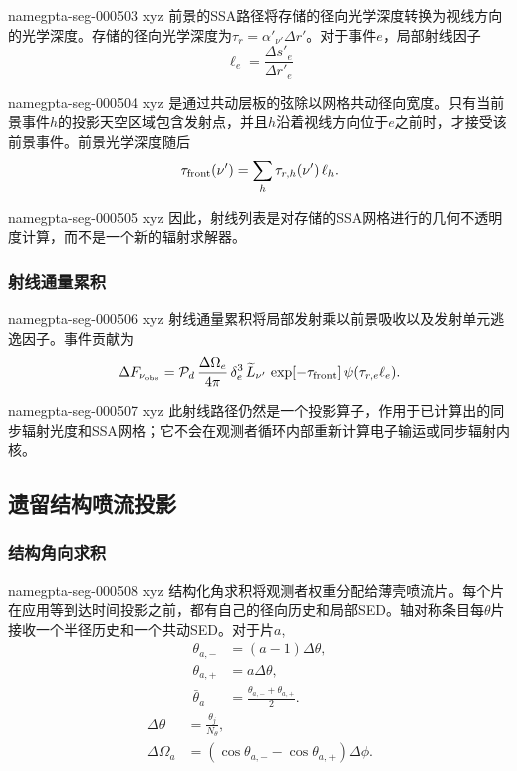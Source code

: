 \documentclass[twocolumn]{aastex702}
\makeatletter
\providecommand{\gptareaderanchor}[1]{\pdfdest name{#1} xyz}%
\providecommand{\gptareaderanchor}[1]{\special{pdf:dest (#1) [ @thispage /XYZ @xpos @ypos null ]}}%
\makeatother
\begin{document}
\gptareaderanchor{gpta-seg-000503}%
前景的SSA路径将存储的径向光学深度转换为视线方向的光学深度。存储的径向光学深度为\(\tau_r=\alpha'_{\nu'}\Delta r'\)。对于事件\(e\)，局部射线因子
\begin{equation}
\ell_e=\frac{\Delta s'_e}{\Delta r'_e}
\end{equation}

\gptareaderanchor{gpta-seg-000504}%
是通过共动层板的弦除以网格共动径向宽度。只有当前景事件\(h\)的投影天空区域包含发射点，并且\(h\)沿着视线方向位于\(e\)之前时，才接受该前景事件。前景光学深度随后
\begin{equation}
\tau_{\rm front}(\nu')=\sum_h \tau_{r,h}(\nu')\,\ell_h.
\end{equation}

\gptareaderanchor{gpta-seg-000505}%
因此，射线列表是对存储的SSA网格进行的几何不透明度计算，而不是一个新的辐射求解器。

\subsubsection{射线通量累积}


\gptareaderanchor{gpta-seg-000506}%
射线通量累积将局部发射乘以前景吸收以及发射单元逃逸因子。事件贡献为
\begin{equation}
\begin{aligned}
\Delta F_{\nu_{\rm obs}}=
\mathcal{P}_d\,\frac{\Delta\Omega_e}{4\pi}\,\delta_e^3\,
\widetilde L_{\nu'}\,
\exp[-\tau_{\rm front}]\,
\psi(\tau_{r,e}\ell_e).
\end{aligned}
\end{equation}

\gptareaderanchor{gpta-seg-000507}%
此射线路径仍然是一个投影算子，作用于已计算出的同步辐射光度和SSA网格；它不会在观测者循环内部重新计算电子输运或同步辐射内核。

\subsection{遗留结构喷流投影}

\subsubsection{结构角向求积}


\gptareaderanchor{gpta-seg-000508}%
结构化角求积将观测者权重分配给薄壳喷流片。每个片在应用等到达时间投影之前，都有自己的径向历史和局部SED。轴对称条目每\(\theta\)片接收一个半径历史和一个共动SED。对于片\(a\),
\begin{equation}
\begin{aligned}
\theta_{a,-}&=(a-1)\Delta\theta,\\
\theta_{a,+}&=a\Delta\theta,\\
\bar\theta_a&=\frac{\theta_{a,-}+\theta_{a,+}}{2}.
\end{aligned}
\end{equation}
\begin{equation}
\begin{aligned}
\Delta\theta&=\frac{\theta_j}{N_\theta},\\
\Delta\Omega_a&=(\cos\theta_{a,-}-\cos\theta_{a,+})\Delta\phi .
\end{aligned}
\end{equation}
\end{document}
